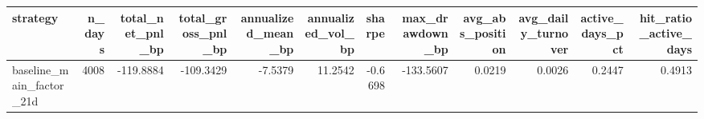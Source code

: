 \begin{tabular}{lrrrrrrrrrrr}
\toprule
strategy & n_days & total_net_pnl_bp & total_gross_pnl_bp & annualized_mean_bp & annualized_vol_bp & sharpe & max_drawdown_bp & avg_abs_position & avg_daily_turnover & active_days_pct & hit_ratio_active_days \\
\midrule
baseline_main_factor_21d & 4008 & -119.8884 & -109.3429 & -7.5379 & 11.2542 & -0.6698 & -133.5607 & 0.0219 & 0.0026 & 0.2447 & 0.4913 \\
\bottomrule
\end{tabular}
